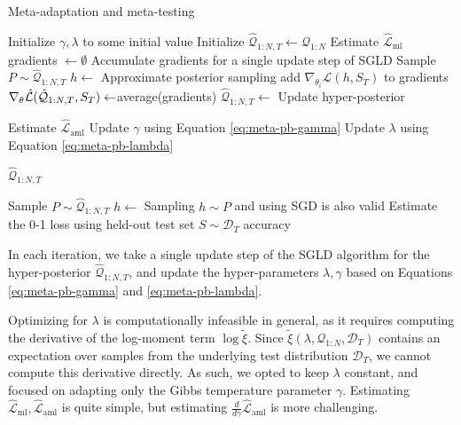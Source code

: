 \documentclass{article}
\theoremstyle{definition}
\begin{document}
\begin{algorithm}[H]
	\caption{Meta-adaptation and meta-testing}
	\label{alg1}
	\small
	\begin{algorithmic}
		\State Initialize $\gamma, \lambda$ to some initial value 
		\State Initialize $\hat{\mathcal{Q}}_{1:N, T}\leftarrow \mathcal{Q}_{1:N}$
		\State Estimate $\hat{\mathcal{L}}_{\mathrm{ml}}$
			\State gradients $\leftarrow \emptyset$ \Comment Accumulate gradients for a single update step of SGLD
				\State Sample $P\sim \hat{\mathcal{Q}}_{1:N, T}$
				\State $h\leftarrow$  \Comment Approximate posterior sampling
				\State add $\nabla_{\theta_i} \hat{\mathcal{L}}(h, S_T)$ to gradients
			\EndFor
			\State $\nabla_\theta \hat{\mathcal{L}}(\hat{\cal Q}_{1:N,T}, S_T)\leftarrow$average(gradients)
			\State $\hat{\mathcal{Q}}_{1:N, T}\leftarrow$  \Comment Update hyper-posterior
			
			\State Estimate $\hat{\mathcal{L}}_{\mathrm{aml}}$
			\State Update $\gamma$ using Equation \ref{eq:meta-pb-gamma}
			\State Update $\lambda$ using Equation \ref{eq:meta-pb-lambda}
			
		\EndWhile
		\State \Return $\hat{\mathcal{Q}}_{1:N, T}$
		\EndFunction
		
		\State Sample $P\sim \hat{\mathcal{Q}}_{1:N, T}$
		\State $h\leftarrow$  \Comment Sampling $h\sim P$ and using SGD is also valid
		\State Estimate the 0-1 loss using held-out test set $S\sim \mathcal{D}_T$
		\State \Return accuracy
		\EndFunction
	\end{algorithmic}
\end{algorithm}

In each iteration, we take a single update step of the SGLD algorithm for the hyper-posterior $\hat{\mathcal{Q}}_{1:N, T}$, and update the hyper-parameters $\lambda,\gamma$ based on Equations \ref{eq:meta-pb-gamma} and \ref{eq:meta-pb-lambda}.

Optimizing for $\lambda$ is computationally infeasible in general, as it requires computing the derivative of the log-moment term $\log\tilde{\xi}$. Since $\tilde{\xi}(\lambda, \mathcal{Q}_{1:N},\mathcal{D}_T)$ contains an expectation over samples from the underlying test distribution $\mathcal{D}_T$, we cannot compute this derivative directly. As such, we opted to keep $\lambda$ constant, and focused on adapting only the Gibbs temperature parameter $\gamma$.
Estimating $\hat{\mathcal{L}}_{\mathrm{ml}},\hat{\mathcal{L}}_{\mathrm{aml}}$ is quite simple, but estimating $\frac{d}{d\gamma}\hat{\mathcal{L}}_{\mathrm{aml}}$ is more challenging.
\end{document}
